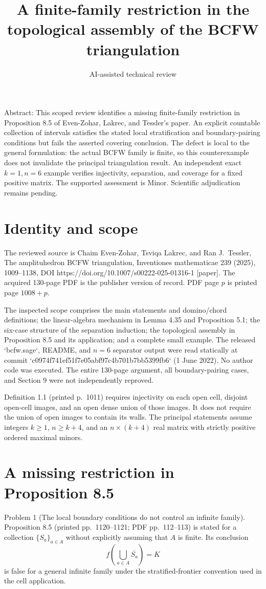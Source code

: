 \documentclass[10pt]{article}
\title{A finite-family restriction in the topological assembly of the BCFW triangulation}
\author{AI-assisted technical review}
\date{}
\begin{document}
\maketitle
Abstract: This scoped review identifies a missing finite-family restriction in Proposition 8.5 of Even-Zohar, Lakrec, and Tessler’s paper. An explicit countable collection of intervals satisfies the stated local stratification and boundary-pairing conditions but fails the asserted covering conclusion. The defect is local to the general formulation: the actual BCFW family is finite, so this counterexample does not invalidate the principal triangulation result. An independent exact \(k=1,n=6\) example verifies injectivity, separation, and coverage for a fixed positive matrix. The supported assessment is Minor. Scientific adjudication remains pending.\par
\section*{Identity and scope}
The reviewed source is Chaim Even-Zohar, Tsviqa Lakrec, and Ran J. Tessler, The amplituhedron BCFW triangulation, Inventiones mathematicae 239 (2025), 1009–1138, DOI https://doi.org/10.1007/s00222-025-01316-1 [paper]. The acquired 130-page PDF is the publisher version of record. PDF page \(p\) is printed page \(1008+p\).\par
The inspected scope comprises the main statements and domino/chord definitions; the linear-algebra mechanism in Lemma 4.35 and Proposition 5.1; the six-case structure of the separation induction; the topological assembly in Proposition 8.5 and its application; and a complete small example. The released `bcfw.sage`, README, and \(n=6\) separator output were read statically at commit `c0974f741ef51f7e05abf97c4b701b7bb5399fb6` (1 June 2022). No author code was executed. The entire 130-page argument, all boundary-pairing cases, and Section 9 were not independently reproved.\par
Definition 1.1 (printed p. 1011) requires injectivity on each open cell, disjoint open-cell images, and an open dense union of those images. It does not require the union of open images to contain its walls. The principal statements assume integers \(k\ge1\), \(n\ge k+4\), and an \(n\times(k+4)\) real matrix with strictly positive ordered maximal minors.\par
\section*{A missing restriction in Proposition 8.5}
Problem 1 (The local boundary conditions do not control an infinite family).  Proposition 8.5 (printed pp. 1120–1121; PDF pp. 112–113) is stated for a collection \(\{S_a\}_{a\in A}\) without explicitly assuming that \(A\) is finite. Its conclusion \[f\left(\bigcup_{a\in A}\overline{S_a}\right)=K\] is false for a general infinite family under the stratified-frontier convention used in the cell application.\par
\end{document}
